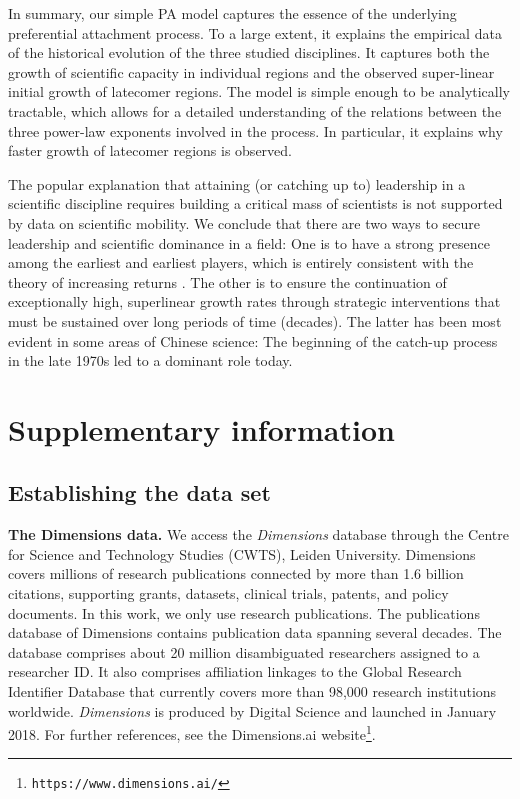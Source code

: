 \documentclass[draft,final]{vutinfth} %
\begin{document}
In summary, our simple PA model captures the essence of the underlying preferential attachment process. To a large extent, it explains the empirical data of the historical evolution of the three studied disciplines. It captures both the growth of scientific capacity in individual regions and the observed super-linear initial growth of latecomer regions. The model is simple enough to be analytically tractable, which allows for a detailed understanding of the relations between the three  power-law exponents involved in the process. In particular, it explains why faster growth of latecomer regions is observed. 

The popular explanation that attaining (or catching up to) leadership in a scientific discipline requires building a critical mass of scientists is not supported by data on scientific mobility. We conclude that there are two ways to secure leadership and scientific dominance in a field: One is to have a strong presence among the earliest and earliest players, which is entirely consistent with the theory of increasing returns \cite{arthur89}. The other is to ensure the continuation of exceptionally high, superlinear growth rates through strategic interventions that must be sustained over long periods of time (decades). The latter has been most evident in some areas of Chinese science: The beginning of the catch-up process in the late 1970s led to a dominant role today.

\newpage

\section{Supplementary information}
\subsection{Establishing the data set}
\label{app:data}

\textbf{The Dimensions data.}
\noindent
 We access the {\em Dimensions} database through the Centre for Science and Technology Studies (CWTS), Leiden University. Dimensions covers millions of research publications connected by more than 1.6 billion citations, supporting grants, datasets, clinical trials, patents, and policy documents. In this work, we only use research publications. The publications database of Dimensions contains publication data spanning several decades. The database comprises about 20 million disambiguated researchers assigned to a researcher ID. It also comprises affiliation linkages to the Global Research Identifier Database that currently covers more than 98,000 research institutions worldwide\cite{hook2018dimensions, herzog2020dimensions}. 
{\em Dimensions} is produced by Digital Science and launched in January 2018. For further references, see the Dimensions.ai website\footnote{\texttt{https://www.dimensions.ai/}}.
\end{document}
